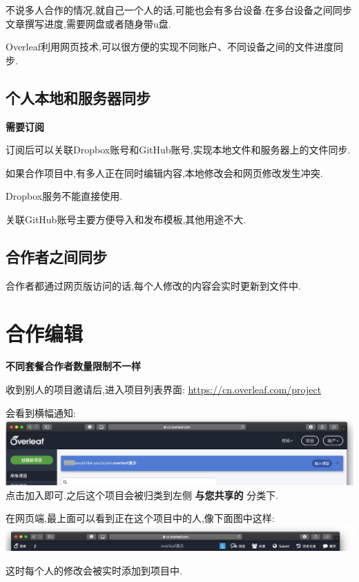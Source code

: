 \documentclass[]{ctexbook}
\begin{document}
不说多人合作的情况,就自己一个人的话,可能也会有多台设备.在多台设备之间同步文章撰写进度,需要网盘或者随身带u盘.

Overleaf利用网页技术,可以很方便的实现不同账户、不同设备之间的文件进度同步.

\hypertarget{section-14}{%
\subsection{个人本地和服务器同步}\label{section-14}}

\textbf{需要订阅}

订阅后可以关联Dropbox账号和GitHub账号,实现本地文件和服务器上的文件同步.

如果合作项目中,有多人正在同时编辑内容,本地修改会和网页修改发生冲突.

Dropbox服务不能直接使用.

关联GitHub账号主要方便导入和发布模板,其他用途不大.

\hypertarget{section-15}{%
\subsection{合作者之间同步}\label{section-15}}

合作者都通过网页版访问的话,每个人修改的内容会实时更新到文件中.

\hypertarget{collaborator}{%
\section{合作编辑}\label{collaborator}}

\textbf{不同套餐合作者数量限制不一样}

收到别人的项目邀请后,进入项目列表界面: \url{https://cn.overleaf.com/project}

会看到横幅通知:
\includegraphics{figure/invite.png}
点击加入即可.之后这个项目会被归类到左侧 \textbf{与您共享的} 分类下.

在网页端,最上面可以看到正在这个项目中的人,像下面图中这样:
\includegraphics{figure/collaborator.png}

这时每个人的修改会被实时添加到项目中.
\end{document}
